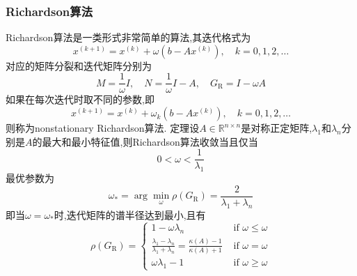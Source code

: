 \documentclass[12pt,a4paper]{article}
\begin{document}
\subsubsection{Richardson算法}
Richardson算法是一类形式非常简单的算法,其迭代格式为
$$
x^{(k+1)}=x^{(k)}+\omega\left(b-A x^{(k)}\right), \quad k=0,1,2, \ldots
$$
对应的矩阵分裂和迭代矩阵分别为
$$
M=\frac{1}{\omega} I, \quad N=\frac{1}{\omega} I-A, \quad G_{\mathrm{R}}=I-\omega A
$$
如果在每次迭代时取不同的参数,即
$$
x^{(k+1)}=x^{(k)}+\omega_{k}\left(b-A x^{(k)}\right), \quad k=0,1,2, \ldots
$$
则称为nonstationary Richardson算法.
{\color{blue}定理}设$A \in \mathbb{R}^{n \times n}$是对称正定矩阵,$\lambda_1$和$\lambda_n$分别是$A$的最大和最小特征值,则Richardson算法收敛当且仅当
$$
0<\omega<\frac{1}{\lambda_{1}}
$$
最优参数为
$$
\omega_{*}=\arg \min _{\omega} \rho\left(G_{\mathrm{R}}\right)=\frac{2}{\lambda_{1}+\lambda_{n}}
$$
即当$\omega=\omega_{*}$时,迭代矩阵的谱半径达到最小,且有
$$
\rho\left(G_{\mathrm{R}}\right)=\left\{\begin{array}{ll}{1-\omega \lambda_{n}} & {\text { if } \omega \leq \omega} \\ {\frac{\lambda_{1}-\lambda_{n}}{\lambda_{1}+\lambda_{n}}=\frac{\kappa(A)-1}{\kappa(A)+1}} & {\text { if } \omega=\omega} \\ {\omega \lambda_{1}-1} & {\text { if } \omega \geq \omega}\end{array}\right.
$$
\end{document}

